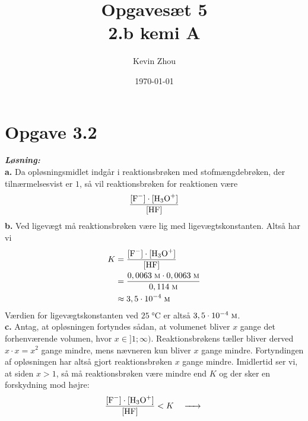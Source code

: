 \documentclass{report}
\title{Opgavesæt 5\\
{\Large \textbf{2.b kemi A}}}
\author{Kevin Zhou}
\date{\today}
\newcommand{\sol}{\setlength{\parindent}{0cm}\textbf{\textit{Løsning:}}\setlength{\parindent}{1cm}}
\begin{document}
\maketitle
\section*{Opgave 3.2}
\sol \\
\textbf{a.}
Da opløsningsmidlet indgår i reaktionsbrøken med stofmængdebrøken, der tilnærmelsesvist er $1$, så vil reaktionsbrøken for reaktionen være
\[
\frac{[\ce{F-} ] \cdot [\ce{H3O+} ]}{[\ce{HF} ]}
\] 
\textbf{b.}
Ved ligevægt må reaktionsbrøken være lig med ligevægtskonstanten. 
Altså har vi 
\begin{equation*}
\begin{split}
  K&=\frac{[\ce{F-} ] \cdot [\ce{H3O+} ]}{[\ce{HF} ]}\\ 
  &=\frac{0,0063 \;\unit{\textsc{m}} \cdot 0,0063 \;\unit{\textsc{m}} }{0,114 \;\unit{\textsc{m}} }\\ 
  &\approx 3,5 \cdot 10^{-4} \;\unit{\textsc{m}} 
\end{split}
\end{equation*}
Værdien for ligevægtskonstanten ved $25 \;\unit{\celsius} $ er altså $3,5 \cdot 10^{-4} \;\unit{\textsc{m}} $. \\[1ex]
\textbf{c.}
Antag, at opløsningen fortyndes sådan, at volumenet bliver $x$ gange det forhenværende volumen, hvor $x \in  ]1;\infty)$.
Reaktionsbrøkens tæller bliver derved $x \cdot x=x^2$ gange mindre, mens nævneren kun bliver $x$ gange mindre. 
Fortyndingen af opløsningen har altså gjort reaktionsbrøken $x$ gange mindre.
Imidlertid ser vi, at siden $x>1$, så må reaktionsbrøken være mindre end $K$ og der sker en forskydning mod højre: 
\[
\frac{[\ce{F-} ] \cdot [\ce{H3O+} ]}{[\ce{HF} ]}<K \quad \ce{->} 
\] 
\end{document}
